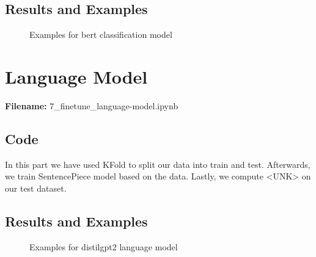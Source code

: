 \documentclass[12pt, a4paper]{article}
\begin{document}
\subsection*{Results and Examples}
\begin{figure}[H]
	\caption{Examples for bert classification model}
	\label{classification-lm_examples}
\end{figure}


\section*{Language Model}
\large{\textbf{Filename:} 7\_finetune\_language-model.ipynb}

\subsection*{Code}
In this part we have used KFold to split our data into train and test. Afterwards, we train SentencePiece model based on the data. Lastly, we compute <UNK> on our test dataset. 

\subsection*{Results and Examples}
\begin{figure}[H]
	\caption{Examples for distilgpt2 language model}
	\label{finetune-lm_examples.png}
\end{figure}
%
\end{document}
